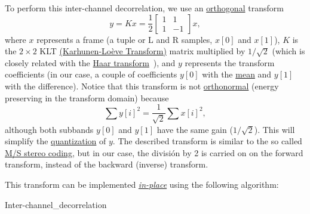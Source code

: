 To perform this inter-channel decorrelation, we use an \href{https://en.wikipedia.org/wiki/Orthogonal_transformation}{orthogonal}
transform
\begin{equation}
  y = Kx = \frac{1}{2}\begin{bmatrix} 1 & 1 \\ 1 & -1 \end{bmatrix}x,
\end{equation}
where $x$ represents a frame (a tuple or L and R samples, $x[0]$ and
$x[1]$), $K$ is the $2\times 2$ KLT
\href{http://fourier.eng.hmc.edu/e161/lectures/klt/node3.html}{(Karhunen-Lo\`eve
  Transform)} matrix multiplied by $1/\sqrt{2}$ (which is closely
related with the \href{http://wavelets.pybytes.com/wavelet/haar/}{Haar
  transform}~\cite{vetterli1995wavelets}), and $y$ represents the
transform coefficients (in our case, a couple of coefficients $y[0]$
with the \href{https://en.wikipedia.org/wiki/Arithmetic_mean}{mean}
and $y[1]$ with the difference). Notice that this transform is not
\href{https://en.wikipedia.org/wiki/Orthonormal_basis}{orthonormal}
(energy preserving in the transform domain) because
\begin{equation}
  \sum y[i]^2 = \frac{1}{\sqrt{2}}\sum x[i]^2,
\end{equation}
although both subbands $y[0]$ and $y[1]$ have the same gain
($1/\sqrt{2}$). This will simplify the
\href{https://en.wikipedia.org/wiki/Quantization_(signal_processing)}{quantization}
of $y$. The described transform is similar to the so
called \href{https://en.wikipedia.org/wiki/Joint_encoding#M/S_stereo_coding}{M/S
stereo coding}, but in our case, the división by 2 is carried on on
the forward transform, instead of the backward (inverse) transform.

This transform can be implemented
\href{https://en.wikipedia.org/wiki/In-place_algorithm}{\emph{in-place}}
using the following algorithm:

\begin{pseudocode}{Inter-channel\_decorrelation}{~}
  \BEGIN
     \\
     \\
  \END
  \ENDPROCEDURE
  \BEGIN
     \\
     \\
  \END
  \ENDPROCEDURE
\end{pseudocode}

